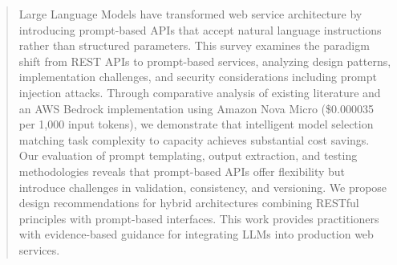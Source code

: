 \begin{abstract}
Large Language Models have transformed web service architecture by introducing prompt-based APIs that accept natural language instructions rather than structured parameters. This survey examines the paradigm shift from REST APIs to prompt-based services, analyzing design patterns, implementation challenges, and security considerations including prompt injection attacks. Through comparative analysis of existing literature and an AWS Bedrock implementation using Amazon Nova Micro (\$0.000035 per 1,000 input tokens), we demonstrate that intelligent model selection matching task complexity to capacity achieves substantial cost savings. Our evaluation of prompt templating, output extraction, and testing methodologies reveals that prompt-based APIs offer flexibility but introduce challenges in validation, consistency, and versioning. We propose design recommendations for hybrid architectures combining RESTful principles with prompt-based interfaces. This work provides practitioners with evidence-based guidance for integrating LLMs into production web services.
\end{abstract}